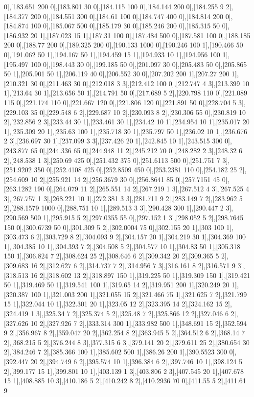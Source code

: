 {0],[183.651 200 0],[183.801 30 0],[184.115 100 0],[184.144 200 0],[184.255 9 2],[184.377 200 0],[184.551 300 0],[184.61 100 0],[184.747 400 0],[184.814 200 0],[184.874 100 0],[185.067 500 0],[185.179 30 0],[185.246 200 0],[185.315 50 0],[186.932 20 1],[187.023 15 1],[187.31 100 0],[187.484 500 0],[187.581 100 0],[188.185 200 0],[188.77 200 0],[189.325 200 0],[190.133 1000 0],[190.246 100 1],[190.466 50 0],[191.062 50 1],[194.167 50 1],[194.459 15 1],[194.933 10 1],[194.956 100 1],[195.497 100 0],[198.443 30 0],[199.185 50 0],[201.097 30 0],[205.483 50 0],[205.865 50 1],[205.901 50 1],[206.119 40 0],[206.552 30 0],[207.202 200 1],[207.27 200 1],[210.321 30 0],[211.463 30 0],[212.018 3 3],[212.412 100 0],[212.747 4 3],[213.399 10 1],[213.64 30 1],[213.656 50 1],[214.791 50 0],[217.689 5 2],[220.798 110 0],[221.089 115 0],[221.174 110 0],[221.667 120 0],[221.806 120 0],[221.891 50 0],[228.704 5 3],[229.103 35 0],[229.548 6 2],[229.687 10 2],[230.093 8 2],[230.306 55 0],[230.819 10 2],[232.856 2 3],[233.44 30 1],[233.461 30 1],[234.42 10 1],[234.954 10 1],[235.017 20 1],[235.309 20 1],[235.63 100 1],[235.718 30 1],[235.797 50 1],[236.02 10 1],[236.676 2 3],[236.697 30 1],[237.099 3 3],[237.426 20 1],[242.845 10 1],[243.515 300 0],[243.877 65 0],[244.336 65 0],[244.948 11 2],[245.212 70 0],[248.282 2 3],[248.32 6 2],[248.538 1 3],[250.69 425 0],[251.432 375 0],[251.6113 500 0],[251.751 7 3],[251.9202 350 0],[252.4108 425 0],[252.8509 450 0],[253.2381 110 0],[254.182 25 2],[254.609 10 2],[255.921 14 2],[256.3679 30 0],[256.8641 85 0],[257.7151 45 0],[263.1282 190 0],[264.079 11 2],[265.551 14 2],[267.219 1 3],[267.512 4 3],[267.525 4 3],[267.757 1 3],[268.221 10 1],[272.381 3 3],[281.711 9 2],[283.149 7 2],[283.962 5 2],[288.1579 1000 0],[288.751 10 1],[289.513 3 3],[290.428 300 1],[290.447 2 3],[290.569 500 1],[295.915 5 2],[297.0355 55 0],[297.152 1 3],[298.052 5 2],[298.7645 150 0],[300.6739 50 0],[301.309 5 2],[302.0004 75 0],[302.155 20 1],[303 100 1],[303.473 6 2],[303.729 8 2],[304.093 9 2],[304.157 20 1],[304.219 30 1],[304.369 100 1],[304.385 10 1],[304.393 7 2],[304.508 5 2],[304.577 10 1],[304.83 50 1],[305.318 150 1],[306.824 7 2],[308.624 25 2],[308.646 6 2],[309.342 20 2],[309.365 5 2],[309.683 16 2],[312.627 6 2],[314.737 7 2],[314.956 7 3],[316.161 8 2],[316.571 9 3],[318.513 16 2],[318.602 13 2],[318.897 150 1],[319.225 50 1],[319.309 150 1],[319.421 50 1],[319.469 50 1],[319.541 100 1],[319.65 14 2],[319.951 200 1],[320.249 20 1],[320.387 100 1],[321.003 200 1],[321.055 15 2],[321.466 75 1],[321.625 7 2],[321.799 15 1],[322.044 10 1],[322.301 20 1],[323.05 12 2],[323.395 14 2],[324.162 15 2],[324.419 1 3],[325.34 7 2],[325.374 5 2],[325.48 7 2],[325.866 12 2],[327.046 6 2],[327.626 10 2],[327.926 7 2],[333.314 300 1],[333.982 500 1],[348.691 15 2],[352.594 9 2],[356.967 8 2],[359.047 20 2],[362.254 8 2],[363.945 5 2],[364.512 6 2],[368.14 7 2],[368.215 5 2],[376.244 8 3],[377.315 6 3],[379.141 20 2],[379.611 25 2],[380.654 30 2],[384.246 7 2],[385.366 100 1],[385.602 500 1],[386.26 200 1],[390.5523 300 0],[392.447 20 2],[394.749 6 2],[395.574 10 1],[396.384 6 2],[397.746 10 1],[398.124 5 2],[399.177 15 1],[399.801 10 1],[403.139 1 3],[403.806 2 3],[407.545 20 1],[407.678 15 1],[408.885 10 3],[410.186 5 2],[410.242 8 2],[410.2936 70 0],[411.55 5 2],[411.61 9 }
